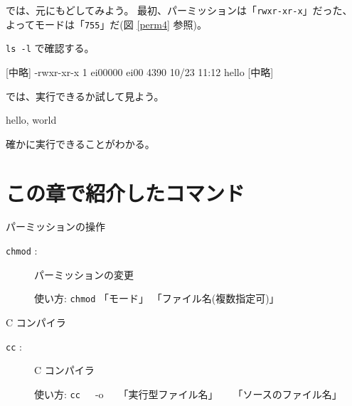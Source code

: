 では、元にもどしてみよう。
最初、パーミッションは「\texttt{rwxr-xr-x}」だった、
よってモードは「\texttt{755}」だ(図 \ref{perm4} 参照)。

\begin{progls}
%
\end{progls}

 \texttt{ls -l} で確認する。

\begin{progls}
 [中略]
-rwxr-xr-x  1 ei00000  ei00  4390  10/23 11:12  hello
 [中略]
\end{progls}

では、実行できるか試して見よう。

\begin{progls}
hello, world
%
\end{progls}

確かに実行できることがわかる。

\section*{この章で紹介したコマンド}

\begin{center}
\begin{minipage}{13cm}
\begin{itembox}[l]{パーミッションの操作}
\begin{description}
\item[\texttt{chmod} :] パーミッションの変更

使い方: \texttt{chmod} 「モード」 「ファイル名(複数指定可)」
\end{description}
\end{itembox}
\end{minipage}
\end{center}

\begin{center}
\begin{minipage}{13cm}
\begin{itembox}[l]{C コンパイラ}
\begin{description}
\item[\texttt{cc} :] C コンパイラ

使い方: \texttt{cc}~~~-o~~~「実行型ファイル名」~~~「ソースのファイル名」
\end{description}
\end{itembox}
\end{minipage}
\end{center}

